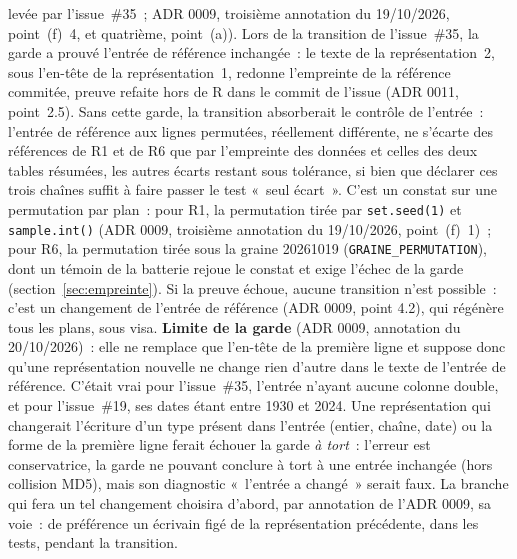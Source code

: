 \documentclass[a4paper,11pt]{article}
\newcommand{\code}[1]{\texttt{\small #1}}
\begin{document}
\begin{enumerate}[leftmargin=*, itemsep=2pt]
    levée par l'issue~\#35~; ADR 0009, troisième annotation du 19/10/2026,
    point~(f)~4, et quatrième, point~(a)). Lors de la transition de
    l'issue~\#35, la garde a prouvé l'entrée de référence inchangée~: le texte
    de la représentation~2, sous l'en-tête de la représentation~1, redonne
    l'empreinte de la référence commitée, preuve refaite hors de R dans le
    commit de l'issue (ADR 0011, point~2.5). Sans cette garde,
    la transition absorberait le contrôle de l'entrée~: l'entrée de
    référence aux lignes permutées, réellement différente, ne s'écarte des
    références de R1 et de R6 que par l'empreinte des données et celles des
    deux tables résumées, les autres écarts restant sous tolérance, si bien
    que déclarer ces trois chaînes suffit à faire passer le test «~seul
    écart~». C'est un constat sur une permutation par plan~: pour R1, la
    permutation tirée par \code{set.seed(1)} et \code{sample.int()} (ADR
    0009, troisième annotation du 19/10/2026, point~(f)~1)~; pour R6, la
    permutation tirée sous la graine 20261019 (\code{GRAINE\_PERMUTATION}),
    dont un témoin de la batterie rejoue le constat et exige l'échec de la
    garde (section~\ref{sec:empreinte}). Si la preuve échoue, aucune
    transition n'est possible~: c'est un changement de l'entrée de référence
    (ADR 0009, point 4.2), qui régénère tous les plans, sous visa.
    \textbf{Limite de la garde} (ADR 0009, annotation du 20/10/2026)~: elle
    ne remplace que l'en-tête de la première ligne et suppose donc qu'une
    représentation nouvelle ne change rien d'autre dans le texte de l'entrée
    de référence. C'était vrai pour l'issue~\#35, l'entrée n'ayant aucune
    colonne double, et pour l'issue~\#19, ses dates étant entre 1930 et 2024.
    Une représentation qui changerait l'écriture d'un type présent dans
    l'entrée (entier, chaîne, date) ou la forme de la première ligne ferait
    échouer la garde \emph{à tort}~: l'erreur est conservatrice, la garde ne
    pouvant conclure à tort à une entrée inchangée (hors collision MD5), mais
    son diagnostic «~l'entrée a changé~» serait faux. La branche qui fera un
    tel changement choisira d'abord, par annotation de l'ADR 0009, sa voie~:
    de préférence un écrivain figé de la représentation précédente, dans les
    tests, pendant la transition.
\end{enumerate}
\end{document}
